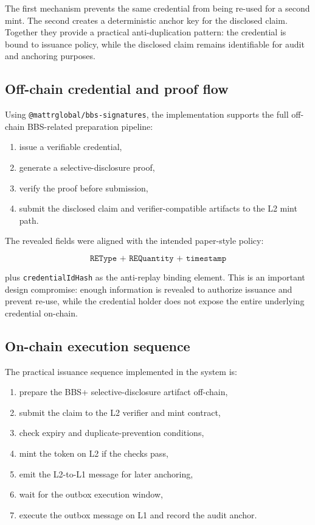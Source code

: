 \documentclass[11pt]{article}
\begin{document}
The first mechanism prevents the same credential from being re-used for a second mint. The second creates a deterministic anchor key for the disclosed claim. Together they provide a practical anti-duplication pattern: the credential is bound to issuance policy, while the disclosed claim remains identifiable for audit and anchoring purposes.

\subsection{Off-chain credential and proof flow}
Using \texttt{@mattrglobal/bbs-signatures}, the implementation supports the full off-chain BBS-related preparation pipeline:

\begin{enumerate}
  \item issue a verifiable credential,
  \item generate a selective-disclosure proof,
  \item verify the proof before submission,
  \item submit the disclosed claim and verifier-compatible artifacts to the L2 mint path.
\end{enumerate}

The revealed fields were aligned with the intended paper-style policy:

\[
\texttt{REType + REQuantity + timestamp}
\]

plus \texttt{credentialIdHash} as the anti-replay binding element. This is an important design compromise: enough information is revealed to authorize issuance and prevent re-use, while the credential holder does not expose the entire underlying credential on-chain.

\subsection{On-chain execution sequence}
The practical issuance sequence implemented in the system is:

\begin{enumerate}
  \item prepare the BBS+ selective-disclosure artifact off-chain,
  \item submit the claim to the L2 verifier and mint contract,
  \item check expiry and duplicate-prevention conditions,
  \item mint the token on L2 if the checks pass,
  \item emit the L2-to-L1 message for later anchoring,
  \item wait for the outbox execution window,
  \item execute the outbox message on L1 and record the audit anchor.
\end{enumerate}
\end{document}
